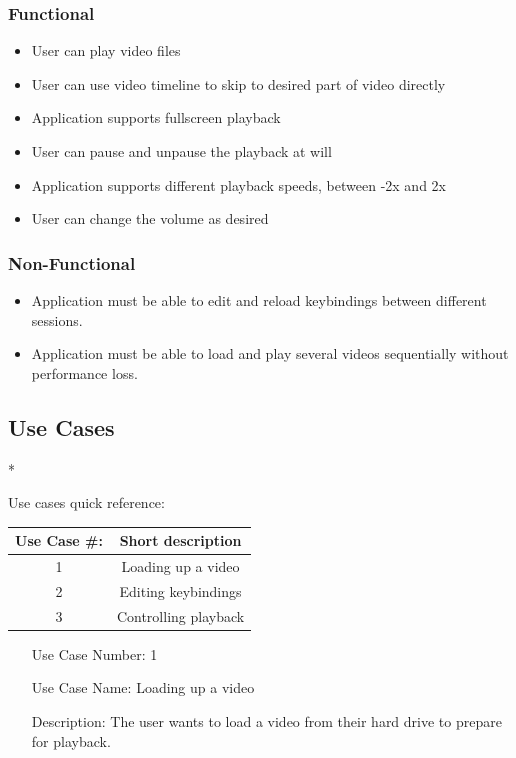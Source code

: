 \documentclass[10pt,conference,onecolumn,compsoc]{IEEEtran}
\begin{document}
\subsubsection{Functional}
\begin{itemize}
\item User can play video files
\item User can use video timeline to skip to desired part of video directly
\item Application supports fullscreen playback 
\item User can pause and unpause the playback at will
\item Application supports different playback speeds, between -2x and 2x
\item User can change the volume as desired
\end{itemize}


\subsubsection{Non-Functional}
\begin{itemize}
\item Application must be able to edit and reload keybindings between different sessions. 
\item Application must be able to load and play several videos sequentially without performance loss.
\end{itemize}

\subsection{Use Cases}*
\begin{center}
Use cases quick reference:
\begin{tabular}{c | c}
Use Case \#: & Short description \\
\hline
1 & Loading up a video \\
2 & Editing keybindings \\
3 & Controlling playback \\
\end{tabular}
\end{center}

\begin{itemize}
\item[Use Case Number:] 1
\item[Use Case Name:] Loading up a video
\item[Description:] The user wants to load a video from their hard drive to prepare for playback.
\end{itemize}
\end{document}
